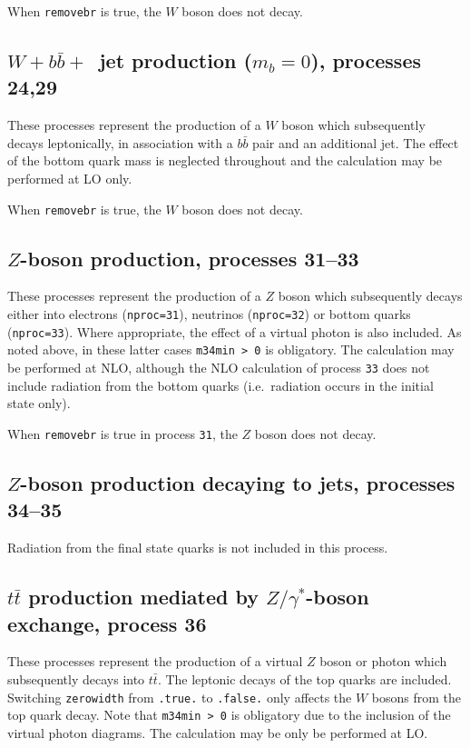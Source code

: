 \documentclass[12pt]{article}
\begin{document}
When {\tt removebr} is true, the $W$ boson does not decay.

\subsection{$W+b{\bar b}+$~jet production ($m_b=0$), processes 24,29}
\label{subsec:wbbjetmassless}

These processes represent the production of a $W$ boson which subsequently
decays leptonically, in association with a $b{\bar b}$ pair and an
additional jet. The effect of the bottom quark mass is neglected throughout
and the calculation may be performed at LO only.

When {\tt removebr} is true, the $W$ boson does not decay.

\subsection{$Z$-boson production, processes 31--33}
\label{subsec:zboson}

These processes represent the production of a $Z$ boson which subsequently
decays either into electrons ({\tt nproc=31}), neutrinos ({\tt nproc=32})
or bottom quarks ({\tt nproc=33}). Where appropriate, the effect of a virtual
photon is also included. As noted above, in these latter cases {\tt m34min > 0}
is obligatory. The calculation may be performed at NLO,
although the NLO calculation of process {\tt 33} does not include radiation
from the bottom quarks (i.e.\ radiation occurs in the initial state only).

When {\tt removebr} is true in process {\tt 31}, the $Z$ boson does not decay.

\subsection{$Z$-boson production decaying to jets, processes 34--35}
Radiation from the final state quarks is not included in this process.

\subsection{$t \bar{t}$ production mediated by $Z/\gamma^*$-boson exchange, process 36}

These processes represent the production of a virtual $Z$ boson or photon 
which subsequently decays into $t \bar{t}$.
The leptonic decays of the top quarks are included.
Switching {\tt zerowidth} from {\tt .true.} to {\tt .false.} only affects
the $W$ bosons from the top quark decay.
Note that {\tt m34min > 0} is obligatory due to the inclusion of the
virtual photon diagrams. The calculation may be only be performed at LO.
\end{document}
